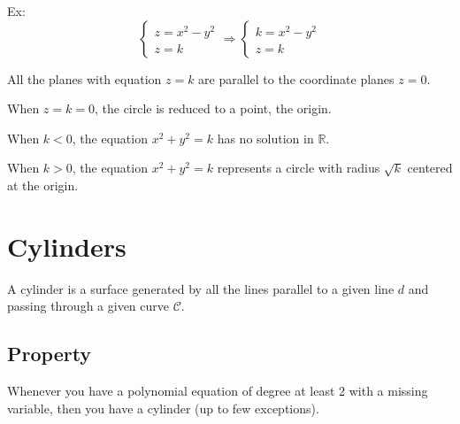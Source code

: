 \documentclass{article}
\begin{document}
Ex:
\[
\begin{cases}
    z = x^2 - y^2\\
    z = k
\end{cases} \Longrightarrow
\begin{cases}
    k = x^2 - y^2\\
    z = k
\end{cases}
\]

\begin{center}
    \pgfplotsset{compat=1.18}
\end{center}

All the planes with equation $z=k$ are parallel to the coordinate planes $z=0$.

When $z=k=0$, the circle is reduced to a point, the origin.

When $k<0$, the equation $x^2+y^2=k$ has no solution in $\mathbb{R}$.

When $k>0$, the equation $x^2+y^2=k$ represents a circle with radius $\sqrt{k}$ centered at the origin.

\section{Cylinders}
A cylinder is a surface generated by all the lines parallel to a given line $d$ and passing through a given curve $\mathcal{C}$.


\subsection{Property}
Whenever you have a polynomial equation of degree at least 2 with a missing variable,
then you have a cylinder (up to few exceptions).
\end{document}
